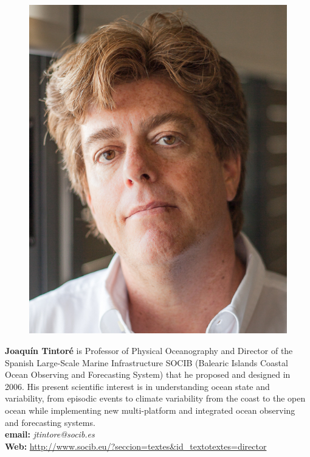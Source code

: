 {\vspace*{3cm}
\parbox{6.5in}{
\begin{figure} %
  \vspace{-\intextsep}
    \hspace*{-.35\columnsep}\includegraphics[scale=0.25]{fig/JTintore.jpeg}
\end{figure}

\textbf{Joaqu\'{i}n Tintor\'{e}} is Professor of Physical Oceanography
and Director of the Spanish Large-Scale Marine Infrastructure SOCIB
(Balearic Islands Coastal Ocean Observing and Forecasting System) that
he proposed and designed in 2006. His present scientific interest is
in understanding ocean state and variability, from episodic events to
climate variability from the coast to the open ocean while
implementing new multi-platform and integrated ocean observing and
forecasting systems.
\\
\textbf{email: }\emph{jtintore@socib.es} \\
\textbf{Web:
}\url{http://www.socib.eu/?seccion=textes&id_textotextes=director} }
}
